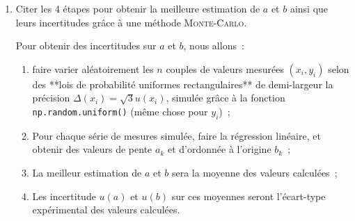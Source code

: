 \documentclass[a4paper, 12pt, final, garamond]{book}
\begin{document}
\begin{enumerate}[label=\sqenumi]
    \item Citer les 4 étapes pour obtenir la meilleure estimation de $a$ et $b$
        ainsi que leurs incertitudes grâce à une méthode \textsc{Monte-Carlo}.
        \begin{solution}
            Pour obtenir des incertitudes sur $a$ et $b$, nous allons~:
            \begin{enumerate}[label=\arabic*)]
                \item faire varier aléatoirement les $n$ couples de valeurs
                    mesurées $(x_i, y_i)$ selon des **lois de probabilité
                    uniformes rectangulaires** de demi-largeur la précision
                    $\Delta(x_i) = \sqrt{3}u(x_i)$, simulée grâce à la
                    fonction \texttt{np.random.uniform()} (même chose pour $y_i$)~;
                \item Pour chaque série de mesures simulée, faire la régression 
                    linéaire, et obtenir des valeurs de pente $a_k$ et
                    d'ordonnée à l'origine $b_k$~;
                \item La meilleur estimation de $a$ et $b$ sera la moyenne des
                    valeurs calculées~;
                \item Les incertitude $u(a)$ et $u(b)$ sur ces moyennes seront
                    l'écart-type expérimental des valeurs calculées.
            \end{enumerate}
\end{solution}
\end{enumerate}

\newpage
~
\end{document}
